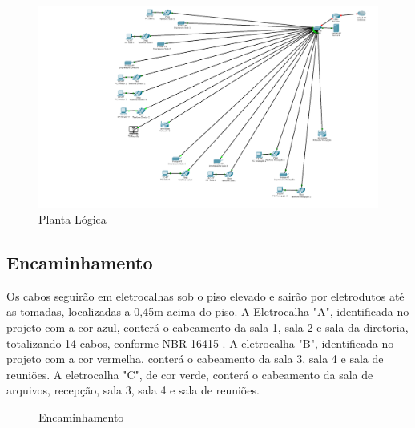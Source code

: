 \documentclass[	DIV=calc,%
paper=a4,%
fontsize=12pt,%
onecolumn]{scrartcl}	 					%
\begin{document}
		\begin{figure}[h]
			\centering	
			\includegraphics[width=\textwidth]{fig2}
			\caption{Planta Lógica}
			\label{fig2}
		\end{figure}
	
	\subsection{Encaminhamento}
	Os cabos seguirão em eletrocalhas sob o piso elevado e sairão por eletrodutos até as tomadas, localizadas a 0,45m acima do piso. A Eletrocalha "A", identificada no projeto com a cor azul, conterá o cabeamento da sala 1, sala 2 e sala da diretoria, totalizando 14 cabos, conforme NBR 16415 \cite{ref1}.
	A eletrocalha "B", identificada no projeto com a cor vermelha, conterá o cabeamento da sala 3, sala 4 e sala de reuniões.	A eletrocalha "C", de cor verde, conterá o cabeamento da sala de arquivos, recepção, sala 3, sala 4 e sala de reuniões. 
	
	
	\clearpage
	\recalctypearea
	
	\begin{figure}
		\noindent{}
		\caption{Encaminhamento}
		\label{fig3}
	\end{figure}
	
\end{document}
